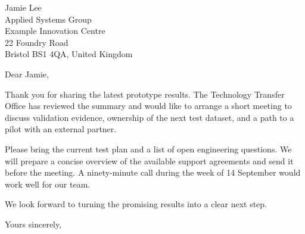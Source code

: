 \documentclass{muletter}
\date{29 August 2026}
\begin{document}
\begin{letter}{
  Jamie Lee\\
  Applied Systems Group\\
  Example Innovation Centre\\
  22 Foundry Road\\
  Bristol BS1 4QA, United Kingdom
}
\opening{Dear Jamie,}

Thank you for sharing the latest prototype results. The Technology Transfer
Office has reviewed the summary and would like to arrange a short meeting to
discuss validation evidence, ownership of the next test dataset, and a path
to a pilot with an external partner.

Please bring the current test plan and a list of open engineering questions.
We will prepare a concise overview of the available support agreements and
send it before the meeting. A ninety-minute call during the week of 14
September would work well for our team.

We look forward to turning the promising results into a clear next step.

\closing{Yours sincerely,}
\end{letter}
\end{document}

